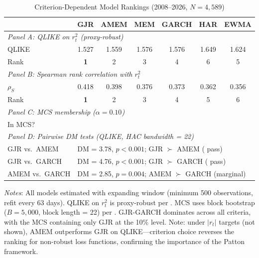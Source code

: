 \documentclass[12pt,a4paper]{article}
\newcommand{\cmark}{\ding{51}}
\newcommand{\xmark}{\ding{55}}
\begin{document}
\begin{table}[H]
\centering
\small
\begin{threeparttable}
\caption{Criterion-Dependent Model Rankings (2008--2026, $N = 4{,}589$)}
\label{tab:criterion_dependent}
\begin{tabular}{@{}lcccccc@{}}
\toprule
& GJR & AMEM & MEM & GARCH & HAR & EWMA \\
\midrule
\multicolumn{7}{l}{\textit{Panel A: QLIKE on $r_t^2$ (proxy-robust)}} \\
QLIKE & 1.527 & 1.559 & 1.576 & 1.576 & 1.649 & 1.624 \\
Rank & \textbf{1} & 2 & 3 & 4 & 6 & 5 \\
\midrule
\multicolumn{7}{l}{\textit{Panel B: Spearman rank correlation with $r_t^2$}} \\
$\rho_S$ & 0.418 & 0.398 & 0.376 & 0.373 & 0.362 & 0.356 \\
Rank & \textbf{1} & 2 & 3 & 4 & 5 & 6 \\
\midrule
\multicolumn{7}{l}{\textit{Panel C: MCS membership ($\alpha = 0.10$)}} \\
In MCS? & \cmark & \xmark & \xmark & \xmark & \xmark & \xmark \\
\midrule
\multicolumn{7}{l}{\textit{Panel D: Pairwise DM tests (QLIKE, HAC bandwidth = 22)}} \\
GJR vs.\ AMEM & \multicolumn{6}{l}{DM = 3.78, $p < 0.001$; GJR $\succ$ AMEM (\citet{harvey2016} pass)} \\
GJR vs.\ GARCH & \multicolumn{6}{l}{DM = 4.76, $p < 0.001$; GJR $\succ$ GARCH (\citet{harvey2016} pass)} \\
AMEM vs.\ GARCH & \multicolumn{6}{l}{DM = 2.85, $p = 0.004$; AMEM $\succ$ GARCH (marginal)} \\
\bottomrule
\end{tabular}
\begin{tablenotes}
\small
\item \textit{Notes}: All models estimated with expanding window (minimum 500 observations, refit every 63 days). QLIKE on $r_t^2$ is proxy-robust per \citet{patton2011}. MCS uses block bootstrap ($B = 5{,}000$, block length = 22) per \citet{hansen2011mcs}. GJR-GARCH dominates across all criteria, with the MCS containing only GJR at the 10\% level. Note: under $|r_t|$ targets (not shown), AMEM outperforms GJR on QLIKE---criterion choice reverses the ranking for non-robust loss functions, confirming the importance of the Patton framework.
\end{tablenotes}
\end{threeparttable}
\end{table}
\end{document}
